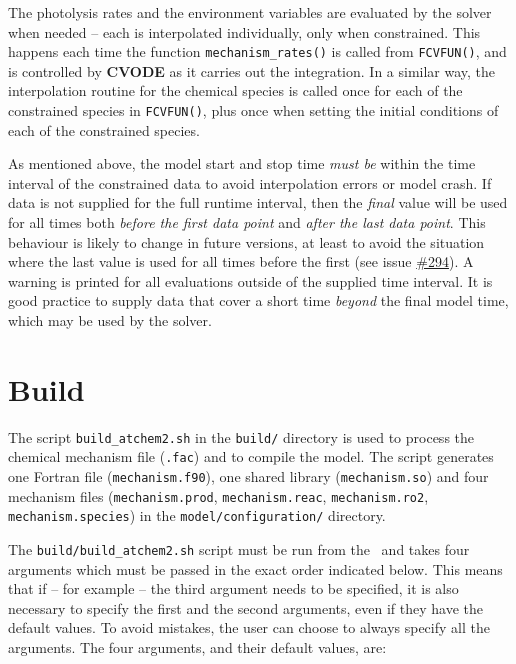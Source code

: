 The photolysis rates and the environment variables are evaluated by
the solver when needed -- each is interpolated individually, only when
constrained. This happens each time the function
\texttt{mechanism\_rates()} is called from \texttt{FCVFUN()}, and is
controlled by \textbf{CVODE} as it carries out the integration. In a
similar way, the interpolation routine for the chemical species is
called once for each of the constrained species in \texttt{FCVFUN()},
plus once when setting the initial conditions of each of the
constrained species.

As mentioned above, the model start and stop time \emph{must be}
within the time interval of the constrained data to avoid
interpolation errors or model crash. If data is not supplied for the
full runtime interval, then the \emph{final} value will be used for
all times both \emph{before the first data point} and \emph{after the
  last data point}. This behaviour is likely to change in future
versions, at least to avoid the situation where the last value is used
for all times before the first (see issue
\href{https://github.com/AtChem/AtChem2/issues/294}{\#294}). A warning
is printed for all evaluations outside of the supplied time
interval. It is good practice to supply data that cover a short time
\emph{beyond} the final model time, which may be used by the solver.

\section{Build} \label{sec:build}

The script \texttt{build\_atchem2.sh} in the \texttt{build/} directory
is used to process the chemical mechanism file (\texttt{.fac}) and to
compile the model. The script generates one Fortran file
(\texttt{mechanism.f90}), one shared library (\texttt{mechanism.so})
and four mechanism files (\texttt{mechanism.prod},
\texttt{mechanism.reac}, \texttt{mechanism.ro2},
\texttt{mechanism.species}) in the \texttt{model/configuration/}
directory.

The \texttt{build/build\_atchem2.sh} script must be run from the
\maindir\ and takes four arguments which must be passed in the exact
order indicated below. This means that if -- for example -- the third
argument needs to be specified, it is also necessary to specify the
first and the second arguments, even if they have the default
values. To avoid mistakes, the user can choose to always specify all
the arguments. The four arguments, and their default values, are:

